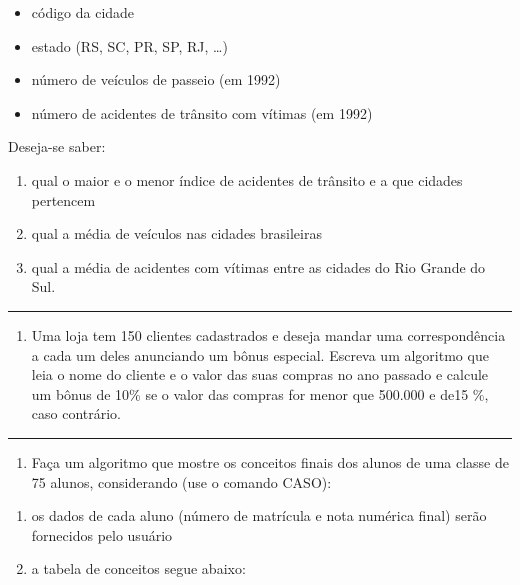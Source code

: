 \documentclass[12pt,a4paper]{article}
\renewcommand{\linethickness}{0.05em}
\providecommand{\tightlist}{%
      \setlength{\itemsep}{0pt}\setlength{\parskip}{0pt}}
\begin{document}
\begin{itemize}
\item
  código da cidade
\item
  estado (RS, SC, PR, SP, RJ, \ldots{})
\item
  número de veículos de passeio (em 1992)
\item
  número de acidentes de trânsito com vítimas (em 1992)
\end{itemize}

Deseja-se saber:

\begin{enumerate}
\def\labelenumi{\alph{enumi})}
\item
  qual o maior e o menor índice de acidentes de trânsito e a que cidades
  pertencem
\item
  qual a média de veículos nas cidades brasileiras
\item
  qual a média de acidentes com vítimas entre as cidades do Rio Grande
  do Sul.
\end{enumerate}

    \begin{center}\rule{0.5\linewidth}{\linethickness}\end{center}

\begin{enumerate}
\def\labelenumi{\arabic{enumi}.}
\setcounter{enumi}{12}
\tightlist
\item
  Uma loja tem 150 clientes cadastrados e deseja mandar uma
  correspondência a cada um deles anunciando um bônus especial. Escreva
  um algoritmo que leia o nome do cliente e o valor das suas compras no
  ano passado e calcule um bônus de 10\% se o valor das compras for
  menor que 500.000 e de15 \%, caso contrário.
\end{enumerate}

    \begin{center}\rule{0.5\linewidth}{\linethickness}\end{center}

\begin{enumerate}
\def\labelenumi{\arabic{enumi}.}
\setcounter{enumi}{13}
\tightlist
\item
  Faça um algoritmo que mostre os conceitos finais dos alunos de uma
  classe de 75 alunos, considerando (use o comando CASO):
\end{enumerate}

\begin{enumerate}
\def\labelenumi{\alph{enumi})}
\item
  os dados de cada aluno (número de matrícula e nota numérica final)
  serão fornecidos pelo usuário
\item
  a tabela de conceitos segue abaixo:
\end{enumerate}
\end{document}
